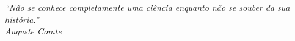 \begin{epigrafe}
    \vspace*{\fill}
	\begin{flushright}
		\textit{``Não se conhece completamente uma ciência enquanto não se souber da sua história.'' \\ Auguste Comte}
	\end{flushright}
\end{epigrafe}
